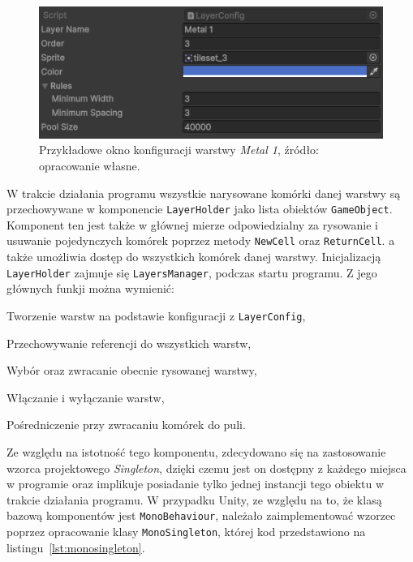 \begin{figure}[h]
    \centering
    \includegraphics[width=.9\textwidth]{chapters/chapter4/rys/layer_config}
    \caption[Przykładowe okno konfiguracji warstwy \textit{Metal 1}.]
    {Przykładowe okno konfiguracji warstwy \textit{Metal 1}, źródło: opracowanie własne.}
    \label{fig:layer_config}
\end{figure}


\indent W trakcie działania programu wszystkie narysowane komórki danej warstwy
są przechowywane w komponencie \texttt{LayerHolder} jako lista obiektów \texttt{GameObject}.
Komponent ten jest także w głównej mierze odpowiedzialny za rysowanie
i usuwanie pojedynczych komórek poprzez metody \texttt{NewCell} oraz \texttt{ReturnCell}.
a także umożliwia dostęp do wszystkich komórek danej warstwy.
Inicjalizacją \texttt{LayerHolder} zajmuje się \texttt{LayersManager}, podczas startu programu.
Z jego głównych funkji można wymienić:

\begin{citemize}
    \item Tworzenie warstw na podstawie konfiguracji z \texttt{LayerConfig},
    \item Przechowywanie referencji do wszystkich warstw,
    \item Wybór oraz zwracanie obecnie rysowanej warstwy,
    \item Włączanie i wyłączanie warstw,
    \item Pośredniczenie przy zwracaniu komórek do puli.
\end{citemize}

Ze względu na istotność tego komponentu, zdecydowano się na zastosowanie wzorca projektowego \textit{Singleton},
dzięki czemu jest on dostępny z każdego miejsca w programie
oraz implikuje posiadanie tylko jednej instancji tego obiektu w trakcie działania programu.
W przypadku Unity, ze względu na to, że klasą bazową komponentów jest \texttt{MonoBehaviour},
należało zaimplementować wzorzec poprzez opracowanie klasy \texttt{MonoSingleton},
której kod przedstawiono na listingu~\ref{lst:monosingleton}.


